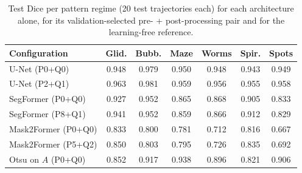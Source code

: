 \begin{table}[t]
\centering
\caption{Test Dice per pattern regime (20 test trajectories each) for each architecture alone, for its validation-selected pre- + post-processing pair and for the learning-free reference.}
\label{tab:regime}
\scriptsize
\setlength{\tabcolsep}{2.5pt}
\begin{tabularx}{\columnwidth}{Y *{6}{c}}
\toprule
\textbf{Configuration} & \textbf{Glid.} & \textbf{Bubb.} & \textbf{Maze} & \textbf{Worms} & \textbf{Spir.} & \textbf{Spots} \\
\midrule
U-Net (P0+Q0) & 0.948 & 0.979 & 0.950 & 0.948 & 0.943 & 0.949 \\
U-Net (P2+Q1) & 0.963 & 0.981 & 0.959 & 0.956 & 0.955 & 0.958 \\
SegFormer (P0+Q0) & 0.927 & 0.952 & 0.865 & 0.868 & 0.905 & 0.833 \\
SegFormer (P8+Q1) & 0.941 & 0.952 & 0.859 & 0.866 & 0.912 & 0.829 \\
Mask2Former (P0+Q0) & 0.833 & 0.800 & 0.781 & 0.712 & 0.816 & 0.667 \\
Mask2Former (P5+Q2) & 0.850 & 0.803 & 0.795 & 0.726 & 0.835 & 0.692 \\
Otsu on $A$ (P0+Q0) & 0.852 & 0.917 & 0.938 & 0.896 & 0.821 & 0.906 \\
\bottomrule
\end{tabularx}
\end{table}
